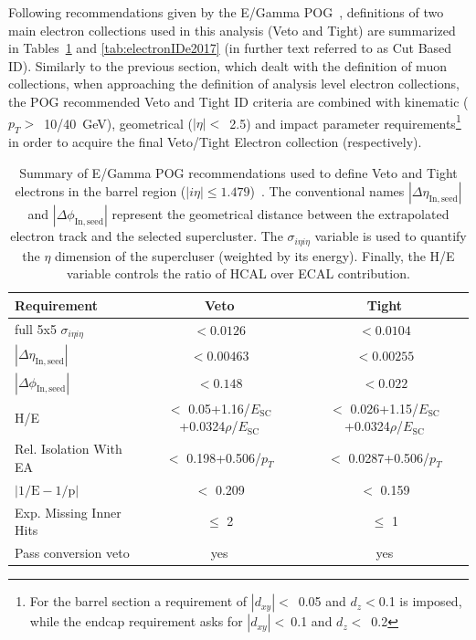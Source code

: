\hspace{10pt} Following recommendations given by the E/Gamma POG~\cite{twiki_egamma_1,twiki_egamma_2}, definitions of two main electron collections used in this analysis (Veto and Tight) are summarized in Tables~\ref{tab:electronIDb2017} and \ref{tab:electronIDe2017} (in further text referred to as Cut Based ID). Similarly to the previous section, which dealt with the definition of muon collections, when approaching the definition of analysis level electron collections, the POG recommended Veto and Tight ID criteria are combined with kinematic ($p_T>$~10/40~GeV), geometrical ($|\eta|<$~2.5) and impact parameter requirements\footnote{For the barrel section a requirement of $|d_{xy}|<$~0.05 and $d_z<$0.1 is imposed, while the endcap requirement asks for $|d_{xy}|<~$0.1 and $d_z<$~0.2} in order to acquire the final Veto/Tight Electron collection (respectively). 
\begin{table}[h]
\footnotesize
\centering
\begin{tabular}{|l|c|c|}
\hline\hline
Requirement    & Veto  & Tight             \\\hline
full 5x5 $\sigma_{i\eta i\eta}$ &  $< 0.0126$ &   $< 0.0104$    \\
$|\Delta\eta_{\mathrm{In,seed}}|$ & $< 0.00463$ & $< 0.00255$ \\
$|\Delta\phi_{\mathrm{In, seed}}|$ & $< 0.148$ & $< 0.022$ \\
H/E & $<$ 0.05+1.16/$E_{\mathrm{SC}}$+0.0324$\rho$/$E_{\mathrm{SC}}$ & $<$ 0.026+1.15/$E_{\mathrm{SC}}$+0.0324$\rho$/$E_{\mathrm{SC}}$ \\
Rel. Isolation With EA & $<$ 0.198+0.506/$p_T$	& $<$ 0.0287+0.506/$p_T$\\
$|1/\mathrm{E} - 1/\mathrm{p}|$ & $<$ 0.209	& $<$ 0.159\\
Exp. Missing Inner Hits & $\leq$ 2&	 $\leq$ 1\\
Pass conversion veto & yes	& yes \\
\hline\hline
\end{tabular}
\caption{Summary of E/Gamma POG recommendations used to define Veto and Tight electrons in the barrel region ($|i\eta|\leq 1.479$)~\cite{twiki_egamma_1,twiki_egamma_2,note:AN_19_257}. The conventional names $|\Delta\eta_{\mathrm{In,seed}}|$ and $|\Delta\phi_{\mathrm{In,seed}}|$ represent the geometrical distance between the extrapolated electron track and the selected supercluster. The $\sigma_{i\eta i\eta}$ variable is used to quantify the $\eta$ dimension of the supercluser (weighted by its energy). Finally, the H/E variable controls the ratio of HCAL over ECAL contribution.}
\label{tab:electronIDb2017}
\end{table}

